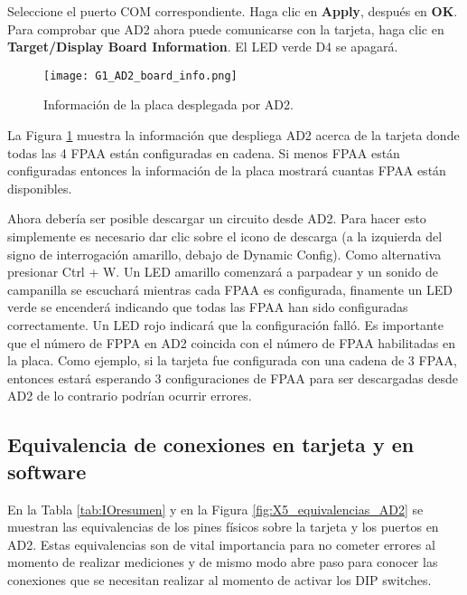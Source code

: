 	Seleccione el puerto COM correspondiente. Haga clic en \textbf{Apply}, después en \textbf{OK}. Para comprobar que AD2 ahora puede comunicarse con la tarjeta, haga clic en \textbf{Target/Display Board Information}. El LED verde D4 se apagará.

	\begin{figure}[hbtp]
		\caption{Información de la placa desplegada por AD2.}
		\label{fig:G1_AD2_board_info}
		\centering
		\texttt{[image: G1\_AD2\_board\_info.png]}
	\end{figure}
	
	La Figura \ref{fig:G1_AD2_board_info} muestra la información que despliega AD2 acerca de la tarjeta donde todas las 4 FPAA están configuradas en cadena. Si menos FPAA están configuradas entonces la información de la placa mostrará cuantas FPAA están disponibles.

	Ahora debería ser posible descargar un circuito desde AD2. Para hacer esto simplemente es necesario dar clic sobre el icono de descarga (a la izquierda del signo de interrogación amarillo, debajo de Dynamic Config). Como alternativa presionar Ctrl + W. Un LED amarillo comenzará a parpadear y un sonido de campanilla se escuchará mientras cada FPAA es configurada, finamente un LED verde se encenderá indicando que todas las FPAA han sido configuradas correctamente. Un LED rojo indicará que la configuración falló. Es importante que el número de FPPA en AD2 coincida con el número de FPAA habilitadas en la placa. Como ejemplo, si la tarjeta fue configurada con una cadena de 3 FPAA, entonces estará esperando 3 configuraciones de FPAA para ser descargadas desde AD2 de lo contrario podrían ocurrir errores.
	
		\subsection{Equivalencia de conexiones en tarjeta y en software}
		
	En la Tabla \ref{tab:IOresumen} y en la Figura \ref{fig:X5_equivalencias_AD2} se muestran las equivalencias de los pines físicos sobre la tarjeta y los puertos en AD2. Estas equivalencias son de vital importancia para no cometer errores al momento de realizar mediciones y de mismo modo abre paso para conocer las conexiones que se necesitan realizar al momento de activar los DIP switches.
		
